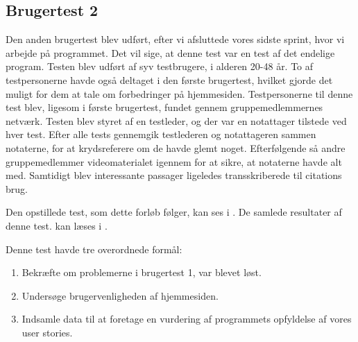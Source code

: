 \subsection{Brugertest 2}
Den anden brugertest blev udført, efter vi afsluttede vores sidste sprint, hvor vi arbejde på programmet.
Det vil sige, at denne test var en test af det endelige program.
Testen blev udført af syv testbrugere, i alderen 20-48 år.
To af testpersonerne havde også deltaget i den første brugertest, hvilket gjorde det muligt for dem at tale om forbedringer på hjemmesiden.
Testpersonerne til denne test blev, ligesom i første brugertest, fundet gennem gruppemedlemmernes netværk.
Testen blev styret af en testleder, og der var en notattager tilstede ved hver test.
Efter alle tests gennemgik testlederen og notattageren sammen notaterne, for at krydsreferere om de havde glemt noget.
Efterfølgende så andre gruppemedlemmer videomaterialet igennem for at sikre, at notaterne havde alt med.
Samtidigt blev interessante passager ligeledes transskriberede til citations brug.

Den opstillede test, som dette forløb følger, kan ses i .
De samlede resultater af denne test. kan læses i . 

Denne test havde tre overordnede formål:
\begin{enumerate}
   \item Bekræfte om problemerne i brugertest 1, var blevet løst. 
   \item Undersøge brugervenligheden af hjemmesiden.
   \item Indsamle data til at foretage en vurdering af programmets opfyldelse af vores user stories. 
\end{enumerate}

